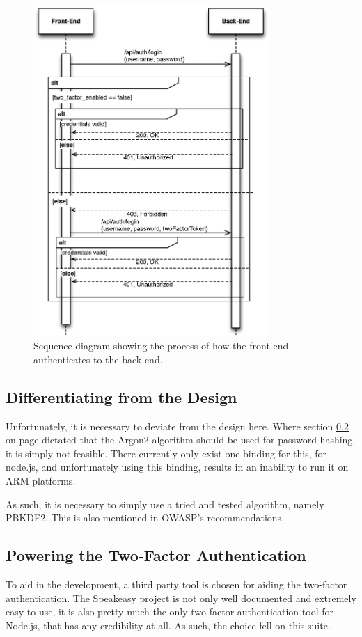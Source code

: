 		\begin{figure}[p]
			\centering
			\includegraphics[width=0.8\textwidth]{figures/implementation/uml/sequence/authentication.eps}
			\caption{Sequence diagram showing the process of how the front-end authenticates to the back-end.}
			\label{fig:sequence:auth}
		\end{figure}

		\subsection{Differentiating from the Design}
			Unfortunately, it is necessary to deviate from the design here. Where section \ref{} on page \pageref{} dictated that the Argon2 algorithm should be used for password hashing, it is simply not feasible. There currently only exist one binding for this, for node.js, and unfortunately using this binding, results in an inability to run it on ARM platforms.

			As such, it is necessary to simply use a tried and tested algorithm, namely PBKDF2. This is also mentioned in OWASP's recommendations\cite{owasp_kdf}.

		\subsection{Powering the Two-Factor Authentication}
			To aid in the development, a third party tool is chosen for aiding the two-factor authentication. The Speakeasy project\cite{speakeasy_lib} is not only well documented and extremely easy to use, it is also pretty much the only two-factor authentication tool for Node.js, that has any credibility at all. As such, the choice fell on this suite.

